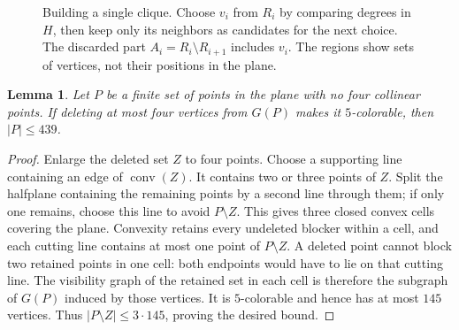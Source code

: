 \documentclass[11pt,a4paper]{amsart}
\newtheorem{lemma}[theorem]{Lemma}
\begin{document}
\begin{figure}[htbp]
\centering
{}
\caption{Building a single clique. Choose $v_i$ from $R_i$ by comparing
  degrees in $H$, then keep only its neighbors as candidates for the next
  choice. The discarded part $A_i=R_i\setminus R_{i+1}$ includes $v_i$.
  The regions show sets of vertices, not their positions in the plane.}
\label{greedy}
\end{figure}

\begin{lemma}\label{deletion}
Let $P$ be a finite set of points in the plane with no four collinear
points. If deleting at most four vertices from $G(P)$ makes it
$5$-colorable, then $|P|\le439$.
\end{lemma}
\begin{proof}
Enlarge the deleted set $Z$ to four points.
Choose a supporting line containing an edge of $\operatorname{conv}(Z)$.
It contains two or three points
of $Z$. Split the halfplane containing the remaining points by a second
line through them; if only one remains, choose this line to avoid
$P\setminus Z$. This gives three closed convex cells covering the plane.
Convexity retains every undeleted blocker within a cell, and each cutting
line contains at most one point of $P\setminus Z$.
A deleted point cannot block two retained points in one cell:
both endpoints would have to lie on that cutting line.
The visibility graph of the retained set in each cell is therefore the
subgraph of $G(P)$ induced by those vertices. It is $5$-colorable and
hence has at most $145$ vertices. Thus
$|P\setminus Z|\le3\cdot145$, proving the desired bound.
\end{proof}
\end{document}
